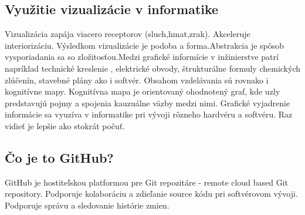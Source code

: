 \documentclass[10pt,oneside,slovak,a4paper]{article}
\begin{document}
\subsection{Využitie vizualizácie v informatike}
Vizualizácia zapája viacero receptorov (sluch,hmat,zrak). Akceleruje interiorizáciu. Výsledkom vizualizácie je  podoba a forma.Abstrakcia je spôsob vysporiadania sa so zložitosťou.Medzi grafické informície v inžinierstve patrí napríklad technické kreslenie , elektrické obvody, štrukturálne formuly chemických zlúčenín, stavebné plány ako i softvér. Obsahom vzdelávania sú rovnako i kognitívne mapy. Kognitívna mapa je orientovaný ohodnotený graf, kde uzly predstavujú pojmy a spojenia kauzuálne väzby medzi nimi. Grafické vyjadrenie informácie sa vyuzíva v informatike pri vývoji rôzneho hardvéru a softvéru.
Raz vidieť je lepšie ako stokrát počuť.
\subsection{Čo je to GitHub?}
GitHub je hostiteľskou platformou pre Git repozitáre - remote cloud based Git repository. Podporuje kolaboráciu a  zdieľanie source kódu pri softvérovom vývoji. Podporuje správu a sledovanie histórie zmien.

\end{document}
